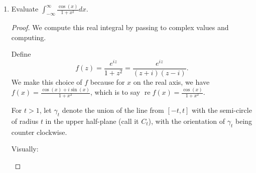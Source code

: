 \documentclass{article}
\DeclareMathOperator{\re}{re}
\begin{document}
\begin{enumerate}
\begin{proof}
		Thus, the functions $f$ which satisfy $|f(z)| \leq C |z|$ are linear functions with no constant term.
	\end{proof}

	\newpage
	\item Evaluate $\displaystyle \int_{-\infty}^\infty \frac{\cos(x)}{1+x^2} dx$. 
	
	\begin{proof}
		
		
		We compute this real integral by passing to complex values and computing.
		
		Define \[f(z) = \frac{e^{iz}}{1+z^2} = \frac{e^{iz}}{(z+i)(z-i)}.\] 
		We make this choice of $f$ because for $x$ on the real axis, we have $f(x) = \frac{\cos(x) + i \sin(x)}{1+x^2}$, which is to say
		$\re f(x) = \frac{\cos (x)}{1+x^2}.$ 
		
		
%		
		For $t > 1$, let $\gamma_t$ denote the union of the line from $[-t,t]$ with the semi-circle of radius $t$ in the upper half-plane (call it $C_t$), with the orientation of $\gamma_t$ being counter clockwise.
		
		Visually:
		
		\begin{center}
		\end{center}
		

\end{proof}
\end{enumerate}
\end{document}
